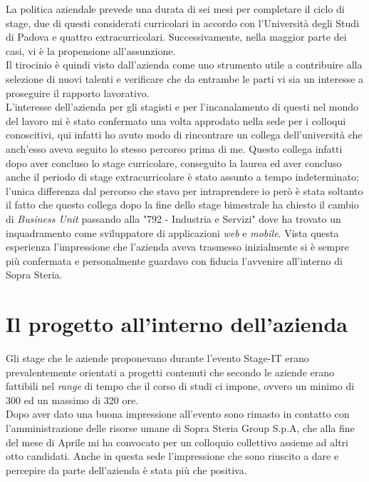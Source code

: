 La politica aziendale prevede una durata di sei mesi per completare il ciclo di stage, due di questi considerati curricolari in accordo con l'Università degli Studi di Padova e quattro extracurricolari. Successivamente, nella maggior parte dei casi, vi è la propensione all'assunzione.\\%

Il tirocinio è quindi visto dall'azienda come uno strumento utile a contribuire alla selezione di nuovi talenti e verificare che da entrambe le parti vi sia un interesse a proseguire il rapporto lavorativo.\\

L'interesse dell'azienda per gli stagisti e per l'incanalamento di questi nel mondo del lavoro mi è stato confermato una volta approdato nella sede per i colloqui conoscitivi, qui infatti ho avuto modo di rincontrare un collega dell'università che anch'esso aveva seguito lo stesso percorso prima di me. Questo collega infatti dopo aver concluso lo stage curricolare, conseguito la laurea ed aver concluso anche il periodo di stage extracurricolare è stato assunto a tempo indeterminato; l'unica differenza dal percorso che stavo per intraprendere io però è stata soltanto il fatto che questo collega dopo la fine dello stage bimestrale ha chiesto il cambio di \textit{Business Unit} passando alla "792 - Industria e Servizi" dove ha trovato un inquadramento come sviluppatore di applicazioni \textit{web} e \textit{mobile}. Vista questa esperienza l'impressione che l'azienda aveva trasmesso inizialmente si è sempre più confermata e personalmente guardavo con fiducia l'avvenire all'interno di Sopra Steria.

\section{Il progetto all'interno dell'azienda}

Gli stage che le aziende proponevano durante l'evento Stage-IT erano prevalentemente orientati a progetti contenuti che secondo le aziende erano fattibili nel \textit{range} di tempo che il corso di studi ci impone, ovvero un minimo di 300 ed un massimo di 320 ore.\\
	
	Dopo aver dato una buona impressione all'evento sono rimasto in contatto con l'amministrazione delle risorse umane di Sopra Steria Group S.p.A, che alla fine del mese di Aprile mi ha convocato per un colloquio collettivo assieme ad altri otto candidati. Anche in questa sede l'impressione che sono riuscito a dare e percepire da parte dell'azienda è stata più che positiva.\\
	
